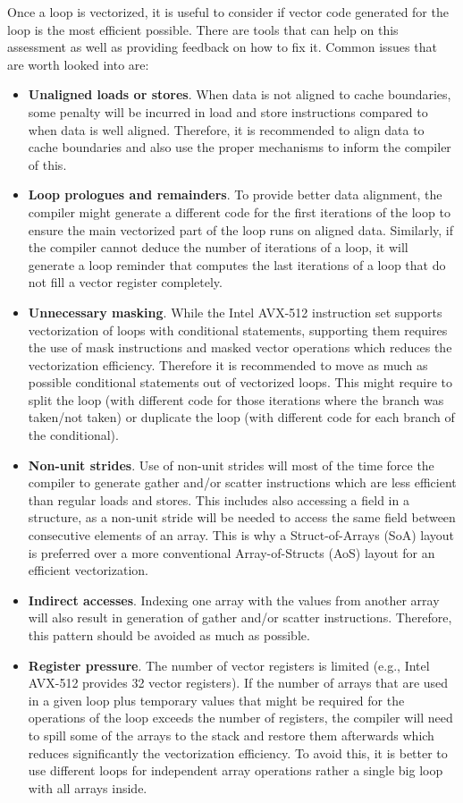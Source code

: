 \documentclass[9pt,comparison]{livecoms}
\begin{document}
Once a loop is vectorized, it is useful to consider if vector code generated for the loop is the most efficient possible. There are tools that can help on this assessment as well as providing feedback on how to fix it\cite{vector-advisor}. Common issues that are worth looked into are:
\begin{itemize}
    \item \textbf{Unaligned loads or stores}. When data is not aligned to cache boundaries, some penalty will be incurred in load and store instructions compared to when data is well aligned. Therefore, it is recommended to align data to cache boundaries and also use the proper mechanisms to inform the compiler of this.
    \item \textbf{Loop prologues and remainders}. To provide better data alignment, the compiler might generate a different code for the first iterations of the loop to ensure the main vectorized part of the loop runs on aligned data. Similarly, if the compiler cannot deduce the number of iterations of a loop, it will generate a loop reminder that computes the last iterations of a loop that do not fill a vector register completely.   
    \item \textbf{Unnecessary masking}. While the Intel AVX-512 instruction set supports vectorization of loops with conditional statements, supporting them requires the use of mask instructions and masked vector operations which reduces the vectorization efficiency. Therefore it is recommended to move as much as possible conditional statements out of vectorized loops. This might require to split the loop (with different code for those iterations where the branch was taken/not taken) or duplicate the loop (with different code for each branch of the conditional).
    \item \textbf{Non-unit strides}. Use of non-unit strides will most of the time force the compiler to generate gather and/or scatter instructions which are less efficient than regular loads and stores. This includes also accessing a field in a structure, as a non-unit stride will be needed to access the same field between consecutive elements of an array. This is why a Struct-of-Arrays (SoA) layout is preferred over a more conventional Array-of-Structs (AoS) layout for an efficient vectorization.
    \item \textbf{Indirect accesses}. Indexing one array with the values from another array will also result in generation of gather and/or scatter instructions. Therefore, this pattern should be avoided as much as possible.
    \item \textbf{Register pressure}. The number of vector registers is limited (e.g., Intel AVX-512 provides 32 vector registers). If the number of arrays that are used in a given loop plus temporary values that might be required for the operations of the loop exceeds the number of registers, the compiler will need to spill some of the arrays to the stack and restore them afterwards which reduces significantly the vectorization efficiency. To avoid this, it is better to use different loops for independent array operations rather a single big loop with all arrays inside.
\end{itemize}
\end{document}
